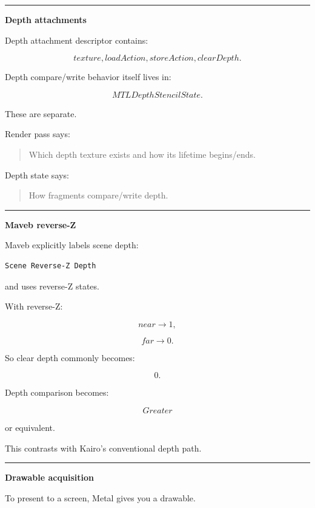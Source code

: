 \begin{center}\rule{0.5\linewidth}{0.5pt}\end{center}

\textbf{Depth attachments}

Depth attachment descriptor contains:

\[
texture,
loadAction,
storeAction,
clearDepth.
\]

Depth compare/write behavior itself lives in:

\[
MTLDepthStencilState.
\]

These are separate.

Render pass says:

\begin{quote}
Which depth texture exists and how its lifetime begins/ends.
\end{quote}

Depth state says:

\begin{quote}
How fragments compare/write depth.
\end{quote}

\begin{center}\rule{0.5\linewidth}{0.5pt}\end{center}

\textbf{Maveb reverse-Z}

Maveb explicitly labels scene depth:

\begin{verbatim}
Scene Reverse-Z Depth
\end{verbatim}

and uses reverse-Z states.

With reverse-Z:

\[
near\rightarrow1,
\]

\[
far\rightarrow0.
\]

So clear depth commonly becomes:

\[
0.
\]

Depth comparison becomes:

\[
Greater
\]

or equivalent.

This contrasts with Kairo's conventional depth path.

\begin{center}\rule{0.5\linewidth}{0.5pt}\end{center}

\textbf{Drawable acquisition}

To present to a screen, Metal gives you a drawable.


